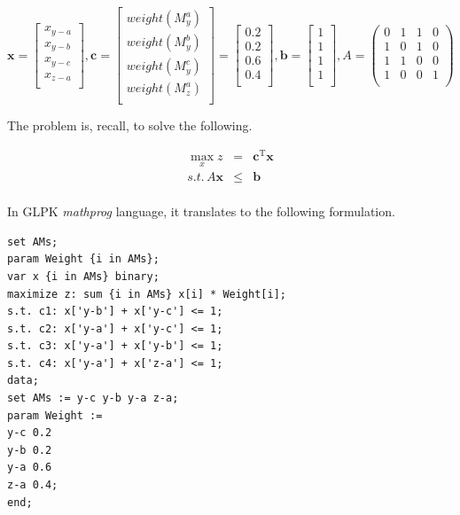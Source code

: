 \[
\mathbf{x} =
\begin{bmatrix}
x_{y-a} \\
x_{y-b} \\
x_{y-c} \\
x_{z-a} \\
\end{bmatrix},
\mathbf{c} = 
\begin{bmatrix}
weight(M_{y}^{a}) \\
weight(M_{y}^{b}) \\
weight(M_{y}^{c}) \\
weight(M_{z}^{a}) \\
\end{bmatrix} =
\begin{bmatrix}
0.2 \\
0.2 \\
0.6 \\
0.4 \\
\end{bmatrix},
\mathbf{b} =
\begin{bmatrix}
1 \\
1 \\
1 \\
1 \\
\end{bmatrix},
A =
\begin{pmatrix}
0 & 1 & 1 & 0 \\
1 & 0 & 1 & 0 \\
1 & 1 & 0 & 0 \\
1 & 0 & 0 & 1 \\
\end{pmatrix}
\]

The problem is, recall, to solve the following.

\begin{eqnarray*}
\max_{x} z & = & \mathbf{c}^{\mathrm{T}}\mathbf{x} \\
s.t.\, A\mathbf{x} & \leqslant & \mathbf{b} \\
\end{eqnarray*}

In GLPK \textit{mathprog} language, it translates to the following formulation. %

\begin{scriptsize}
\begin{verbatim}
set AMs;
param Weight {i in AMs};
var x {i in AMs} binary;
maximize z: sum {i in AMs} x[i] * Weight[i];
s.t. c1: x['y-b'] + x['y-c'] <= 1;
s.t. c2: x['y-a'] + x['y-c'] <= 1;
s.t. c3: x['y-a'] + x['y-b'] <= 1;
s.t. c4: x['y-a'] + x['z-a'] <= 1;
data;
set AMs := y-c y-b y-a z-a;
param Weight :=
y-c 0.2
y-b 0.2
y-a 0.6
z-a 0.4;
end;
\end{verbatim}
\end{scriptsize}

